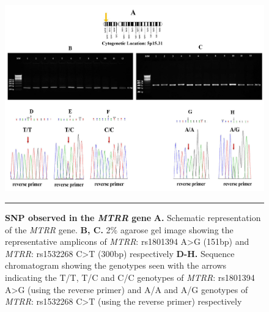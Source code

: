 \begin{refsection}
\begin{figure}
\centering
\includegraphics[scale=0.7,keepaspectratio]{Figures/Figure6_3edit.pdf}
\rule{35em}{0.5pt}
\caption[SNP observed in the \textit{MTRR} gene]{\textbf{SNP observed in the \textit{MTRR} gene}
\textbf{A.} Schematic representation of the \textit{MTRR} gene. \textbf{B, C.} 2\% agarose gel image showing the representative amplicons of \textit{MTRR}: rs1801394 A>G (151bp) and \textit{MTRR}:  rs1532268 C>T (300bp) respectively \textbf{D-H.} Sequence chromatogram showing the genotypes seen with the arrows indicating the T/T, T/C and C/C genotypes of \textit{MTRR}: rs1801394 A>G (using the reverse primer) and A/A and A/G genotypes of \textit{MTRR}: rs1532268 C>T (using the reverse primer) respectively}
\label{fig:6_3}
\end{figure}



\end{refsection}
